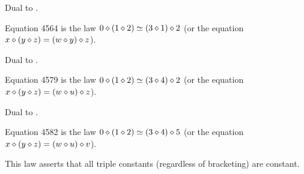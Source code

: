 Dual to .

\begin{definition}[Equation 4564]\label{eq4564}\leanok{}  Equation 4564 is the law $0 \diamond (1 \diamond 2)  \simeq  (3 \diamond 1) \diamond 2$ (or the equation $x \diamond (y \diamond z) = (w \diamond y) \diamond z$).
\end{definition}

Dual to .

\begin{definition}[Equation 4579]\label{eq4579}\leanok{}  Equation 4579 is the law $0 \diamond (1 \diamond 2)  \simeq  (3 \diamond 4) \diamond 2$ (or the equation $x \diamond (y \diamond z) = (w \diamond u) \diamond z$).
\end{definition}

Dual to .

\begin{definition}[Equation 4582]\label{eq4582}\leanok{}  Equation 4582 is the law $0 \diamond (1 \diamond 2)  \simeq  (3 \diamond 4) \diamond 5$ (or the equation $x \diamond (y \diamond z) = (w \diamond u) \diamond v$).
\end{definition}

This law asserts that all triple constants (regardless of bracketing) are constant.
